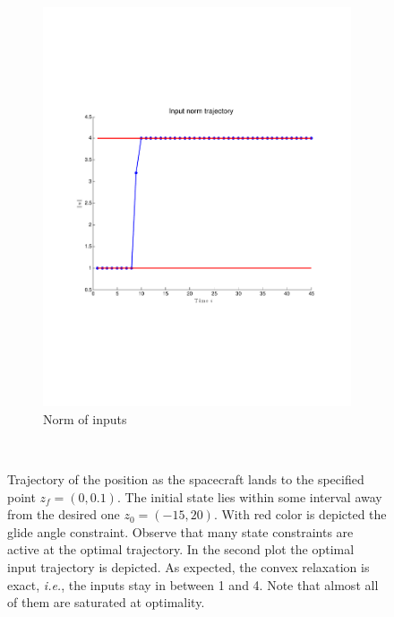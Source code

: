 \documentclass[openany]{now}
\newcommand{\ie}{{\it i.e.}}
\begin{document}
\begin{figure}
\begin{subfigure}[b]{0.5\textwidth}
                \includegraphics[width=\textwidth]{Figures/inputs}
                \caption{Norm of inputs}
                \label{fig:soft-landing-inputs}
        \end{subfigure}%
        ~ %
        \caption{Trajectory of the position as the spacecraft lands to the specified point $z_f=(0,0.1)$. The initial state lies within some interval away from the desired one $z_0=(-15,20)$. With red color is depicted the glide angle constraint. Observe that many state constraints are active at the optimal trajectory. In the second plot the optimal input trajectory is depicted. As expected, the convex relaxation is exact, \ie, the inputs stay in between 1 and 4. Note that almost all of them are saturated at optimality.}\label{fig:animals}
\end{figure}
\end{document}
